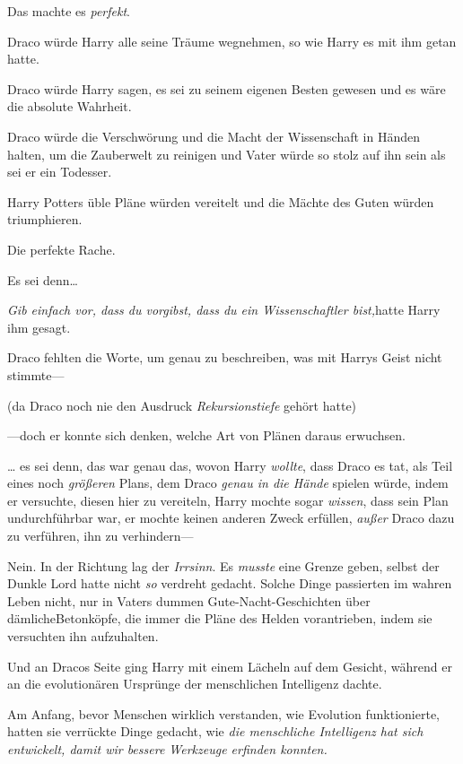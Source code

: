 {Das machte es \emph{perfekt}.

Draco würde Harry alle seine Träume wegnehmen, so wie Harry es mit ihm getan hatte.

Draco würde Harry sagen, es sei zu seinem eigenen Besten gewesen und es wäre die absolute Wahrheit.

Draco würde die Verschwörung und die Macht der Wissenschaft in Händen halten, um die Zauberwelt zu reinigen und Vater würde so stolz auf ihn sein als sei er ein Todesser.

Harry Potters üble Pläne würden vereitelt und die Mächte des Guten würden triumphieren.

Die perfekte Rache.

Es sei denn…

\emph{Gib einfach vor, dass du vorgibst, dass du ein Wissenschaftler bist,}hatte Harry ihm gesagt.

Draco fehlten die Worte, um genau zu beschreiben, was mit Harrys Geist nicht stimmte—

(da Draco noch nie den Ausdruck \emph{Rekursionstiefe} gehört hatte)

—doch er konnte sich denken, welche Art von Plänen daraus erwuchsen.

… es sei denn, das war genau das, wovon Harry \emph{wollte}, dass Draco es tat, als Teil eines noch \emph{größeren} Plans, dem Draco \emph{genau in die Hände} spielen würde, indem er versuchte, diesen hier zu vereiteln, Harry mochte sogar \emph{wissen}, dass sein Plan undurchführbar war, er mochte keinen anderen Zweck erfüllen, \emph{außer} Draco dazu zu verführen, ihn zu verhindern—

Nein. In der Richtung lag der \emph{Irrsinn}. Es \emph{musste} eine Grenze geben, selbst der Dunkle Lord hatte nicht \emph{so} verdreht gedacht. Solche Dinge passierten im wahren Leben nicht, nur in Vaters dummen Gute-Nacht-Geschichten über dämlicheBetonköpfe, die immer die Pläne des Helden vorantrieben, indem sie versuchten ihn aufzuhalten.

\later

Und an Dracos Seite ging Harry mit einem Lächeln auf dem Gesicht, während er an die evolutionären Ursprünge der menschlichen Intelligenz dachte.

Am Anfang, bevor Menschen wirklich verstanden, wie Evolution funktionierte, hatten sie verrückte Dinge gedacht, wie \emph{die menschliche Intelligenz hat sich entwickelt, damit wir bessere Werkzeuge erfinden konnten.}

}
